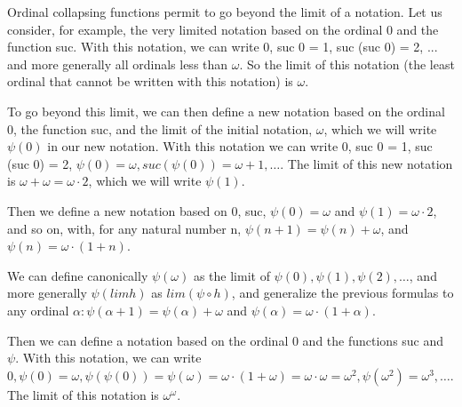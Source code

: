 \documentclass[10pt]{article}
\begin{document}
Ordinal collapsing functions permit to go beyond the limit of a notation.
Let us consider, for example, the very limited notation based on the ordinal 0 and the function suc.
With this notation, we can write 0, suc 0 = 1, suc (suc 0) = 2, ... and more generally all ordinals less than \( \omega \).
So the limit of this notation (the least ordinal that cannot be written with this notation) is \( \omega \).

\begin{comment}
Then we can go beyond this limit by introducing \( \psi(0) \) which is defined as the limit of the initial notation : \( \psi(0) = \omega \).
Then we consider the notation based on 0, suc and \( \psi(0) = \omega \). 
\end{comment}

To go beyond this limit, we can then define a new notation based on the ordinal 0, the function suc, and the limit of the initial notation, \( \omega \), which we will write \( \psi(0) \) in our new notation.
With this notation we can write 0, suc 0 = 1, suc (suc 0) = 2, \( \psi(0) = \omega, suc(\psi(0)) = \omega+1, \ldots \). The limit of this new notation is \( \omega+\omega = \omega \cdot 2 \), which we will write \( \psi(1) \).

\begin{comment}
Then we define \( \psi(1) \) as the limit of this new notation : \( \psi(1) = \omega \cdot 2 \) and a new notation based on 0, suc, \( \psi(0), \psi(1) \) and so on, with \( \psi(n+1) = \psi(n)+\omega \) for any natural number n.
\end{comment}

Then we define a new notation based on 0, suc, \( \psi(0) = \omega \) and \( \psi(1) = \omega \cdot 2 \), and so on, with, for any natural number n, \( \psi(n+1) = \psi(n)+\omega \), and \( \psi(n) = \omega \cdot (1+n) \).

We can define canonically \( \psi(\omega) \) as the limit of \( \psi(0), \psi(1), \psi(2), \ldots \), and more generally \( \psi(lim h) \) as \( lim (\psi \circ h) \), and generalize the previous formulas to any ordinal \( \alpha : \psi(\alpha+1) = \psi(\alpha)+\omega \) and \( \psi(\alpha) = \omega \cdot (1+\alpha) \).

\begin{comment}
With these definitions, we have the general formula \( \psi(\alpha) = \omega \cdot (1+\alpha) \).
\end{comment}

Then we can define a notation based on the ordinal 0 and the functions suc and \( \psi \).
With this notation, we can write \( 0, \psi(0) = \omega, \psi(\psi(0)) = \psi(\omega) = \omega \cdot (1+\omega) = \omega \cdot \omega = \omega^2, \psi(\omega^2) = \omega^3, \ldots \). The limit of this notation is \( \omega^\omega \). 
\end{document}
